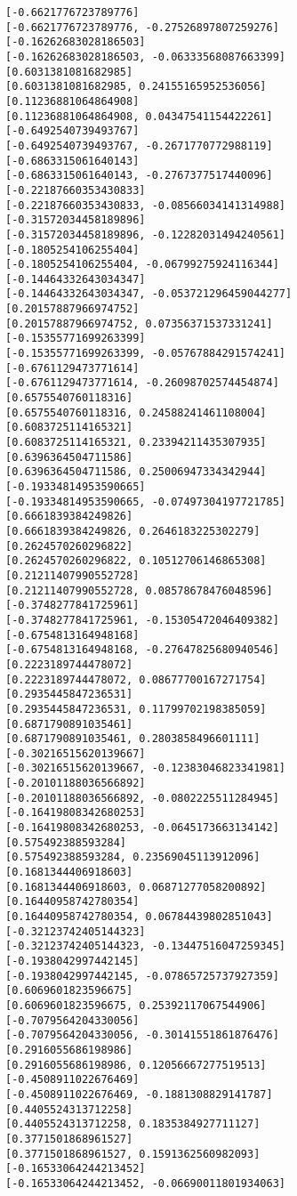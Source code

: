 \documentclass[11pt]{article}
\begin{document}
\begin{Verbatim}[commandchars=\\\{\}]
[-0.6621776723789776]
[-0.6621776723789776, -0.27526897807259276]
[-0.16262683028186503]
[-0.16262683028186503, -0.06333568087663399]
[0.6031381081682985]
[0.6031381081682985, 0.24155165952536056]
[0.11236881064864908]
[0.11236881064864908, 0.04347541154422261]
[-0.6492540739493767]
[-0.6492540739493767, -0.2671770772988119]
[-0.6863315061640143]
[-0.6863315061640143, -0.2767377517440096]
[-0.22187660353430833]
[-0.22187660353430833, -0.08566034141314988]
[-0.31572034458189896]
[-0.31572034458189896, -0.12282031494240561]
[-0.1805254106255404]
[-0.1805254106255404, -0.06799275924116344]
[-0.14464332643034347]
[-0.14464332643034347, -0.053721296459044277]
[0.20157887966974752]
[0.20157887966974752, 0.07356371537331241]
[-0.15355771699263399]
[-0.15355771699263399, -0.05767884291574241]
[-0.6761129473771614]
[-0.6761129473771614, -0.26098702574454874]
[0.6575540760118316]
[0.6575540760118316, 0.24588241461108004]
[0.6083725114165321]
[0.6083725114165321, 0.23394211435307935]
[0.6396364504711586]
[0.6396364504711586, 0.25006947334342944]
[-0.19334814953590665]
[-0.19334814953590665, -0.07497304197721785]
[0.6661839384249826]
[0.6661839384249826, 0.2646183225302279]
[0.2624570260296822]
[0.2624570260296822, 0.10512706146865308]
[0.21211407990552728]
[0.21211407990552728, 0.08578678476048596]
[-0.3748277841725961]
[-0.3748277841725961, -0.15305472046409382]
[-0.6754813164948168]
[-0.6754813164948168, -0.27647825680940546]
[0.2223189744478072]
[0.2223189744478072, 0.08677700167271754]
[0.2935445847236531]
[0.2935445847236531, 0.11799702198385059]
[0.6871790891035461]
[0.6871790891035461, 0.2803858496601111]
[-0.30216515620139667]
[-0.30216515620139667, -0.12383046823341981]
[-0.20101188036566892]
[-0.20101188036566892, -0.0802225511284945]
[-0.16419808342680253]
[-0.16419808342680253, -0.0645173663134142]
[0.575492388593284]
[0.575492388593284, 0.23569045113912096]
[0.1681344406918603]
[0.1681344406918603, 0.06871277058200892]
[0.16440958742780354]
[0.16440958742780354, 0.06784439802851043]
[-0.32123742405144323]
[-0.32123742405144323, -0.13447516047259345]
[-0.1938042997442145]
[-0.1938042997442145, -0.07865725737927359]
[0.6069601823596675]
[0.6069601823596675, 0.25392117067544906]
[-0.7079564204330056]
[-0.7079564204330056, -0.30141551861876476]
[0.2916055686198986]
[0.2916055686198986, 0.12056667277519513]
[-0.4508911022676469]
[-0.4508911022676469, -0.1881308829141787]
[0.4405524313712258]
[0.4405524313712258, 0.1835384927711127]
[0.3771501868961527]
[0.3771501868961527, 0.1591362560982093]
[-0.16533064244213452]
[-0.16533064244213452, -0.06690011801934063]

\end{Verbatim}
\end{document}
